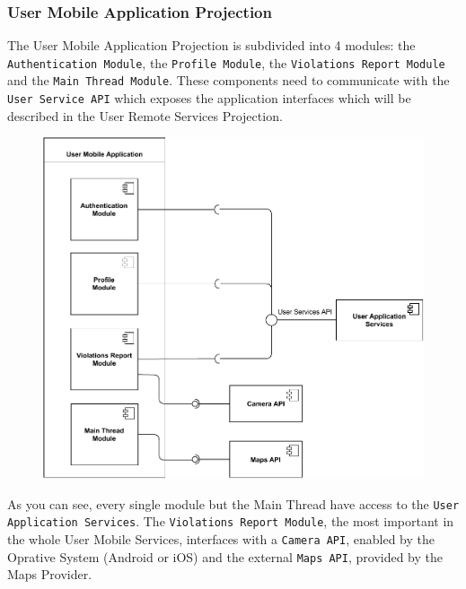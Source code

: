\documentclass[12pt,a4paper]{article}
\begin{document}
\subsubsection{User Mobile Application Projection}
The User Mobile Application Projection is subdivided into 4 modules: the \texttt{Authentication Module}, the \texttt{Profile Module}, the \texttt{Violations Report Module} and the \texttt{Main Thread Module}. These components need to communicate with the \texttt{User Service API} which exposes the application interfaces which will be described in the User Remote Services Projection. 
\begin{figure}[H]
		\centering
		\includegraphics[width=1.2\linewidth]{../assets/images/user_mobile_projection.pdf}
	\end{figure}
As you can see, every single module but the Main Thread have access to the \texttt{User Application Services}. The \texttt{Violations Report Module}, the most important in the whole User Mobile Services, interfaces with a \texttt{Camera API}, enabled by the Oprative System (Android or iOS) and the external \texttt{Maps API}, provided by the Maps Provider.
\end{document}
